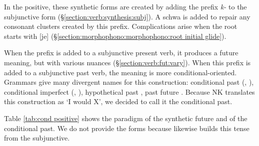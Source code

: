 In the positive, these synthetic forms are created by adding the prefix \textit{{k-}} to the subjunctive form (\S\ref{section:verb:synthesis:subj}). A schwa is added to repair any consonant clusters created by this prefix. Complications arise when the root starts with [je] (\S\ref{section:morphophono:morphophono:root initial glide}).


When the prefix is added to a subjunctive present verb, it produces a future meaning, but with various nuances (\S\ref{section:verb:fut:vary}). When this prefix is added to a subjunctive past verb, the meaning is more conditional-oriented. Grammars give many divergent names for this construction: conditional past (\citealt[160]{Hagopian-2007-ArmenianTextbookEveryone}, \citealt[260]{DumTragut-2009-ArmenianReferenceGrammar}), conditional imperfect (\citealt[192]{Minassian-1980-EastArmenianGrammar}, \citealt[196]{BardakjianVaux-1999-easternArmeniantextbook}), hypothetical past \citep[225]{Sakayan-2007-TextbookEasternArmenian}, past future \citep[132]{fairbanksStevick-1975-spokenEastArmenian}. Because NK   translates this construction as `I would X', we decided to call it the conditional past. 

Table \ref{tab:cond positive} shows the paradigm of the synthetic future and of the conditional past. We do not provide the {\seaSEA} forms because {\seaSEA} likewise builds this tense from the subjunctive.

